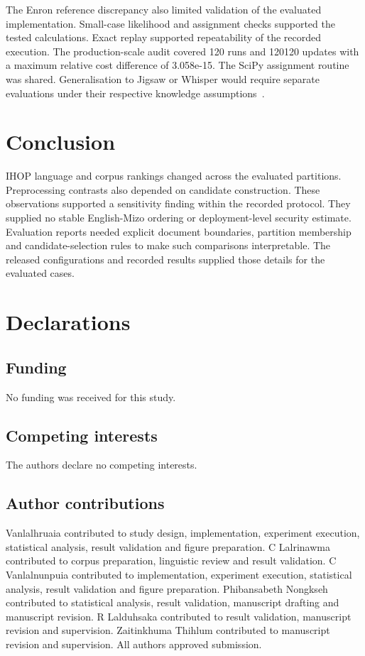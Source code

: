 \documentclass[pdflatex,sn-mathphys-num]{sn-jnl}%
\theoremstyle{thmstyleone}%
\theoremstyle{thmstyletwo}%
\theoremstyle{thmstylethree}%
\newcommand{\IndependentAuditRuns}{120}
\newcommand{\IndependentAuditUpdates}{120120}
\newcommand{\IndependentAuditMaxRelative}{3.058e-15}
\begin{document}
The Enron reference discrepancy also limited validation of the evaluated implementation. Small-case likelihood and assignment checks supported the tested calculations. Exact replay supported repeatability of the recorded execution. The production-scale audit covered \IndependentAuditRuns{} runs and \IndependentAuditUpdates{} updates with a maximum relative cost difference of \IndependentAuditMaxRelative{}. The SciPy assignment routine was shared. Generalisation to Jigsaw or Whisper would require separate evaluations under their respective knowledge assumptions~\cite{jigsaw,whisper}.

\section{Conclusion}
IHOP language and corpus rankings changed across the evaluated partitions. Preprocessing contrasts also depended on candidate construction. These observations supported a sensitivity finding within the recorded protocol. They supplied no stable English-Mizo ordering or deployment-level security estimate. Evaluation reports needed explicit document boundaries, partition membership and candidate-selection rules to make such comparisons interpretable. The released configurations and recorded results supplied those details for the evaluated cases.


\backmatter

\section*{Declarations}
\subsection*{Funding}
No funding was received for this study.

\subsection*{Competing interests}
The authors declare no competing interests.

\subsection*{Author contributions}
Vanlalhruaia contributed to study design, implementation, experiment execution, statistical analysis, result validation and figure preparation. C Lalrinawma contributed to corpus preparation, linguistic review and result validation. C Vanlalnunpuia contributed to implementation, experiment execution, statistical analysis, result validation and figure preparation. Phibansabeth Nongkseh contributed to statistical analysis, result validation, manuscript drafting and manuscript revision. R Lalduhsaka contributed to result validation, manuscript revision and supervision. Zaitinkhuma Thihlum contributed to manuscript revision and supervision. All authors approved submission.
\end{document}
